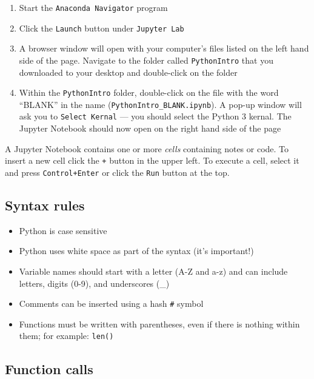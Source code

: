 \documentclass[
]{book}
\providecommand{\tightlist}{%
  \setlength{\itemsep}{0pt}\setlength{\parskip}{0pt}}
\begin{document}
\begin{enumerate}
\def\labelenumi{\arabic{enumi}.}
\tightlist
\item
  Start the \texttt{Anaconda\ Navigator} program
\item
  Click the \texttt{Launch} button under \texttt{Jupyter\ Lab}
\item
  A browser window will open with your computer's files listed on the left hand side of the page. Navigate to the folder called \texttt{PythonIntro} that you downloaded to your desktop and double-click on the folder
\item
  Within the \texttt{PythonIntro} folder, double-click on the file with the word ``BLANK'' in the name (\texttt{PythonIntro\_BLANK.ipynb}). A pop-up window will ask you to \texttt{Select\ Kernal} --- you should select the Python 3 kernal. The Jupyter Notebook should now open on the right hand side of the page
\end{enumerate}

A Jupyter Notebook contains one or more \emph{cells} containing notes or code. To insert a new cell click the \texttt{+} button in the upper left. To execute a cell, select it and press \texttt{Control+Enter} or click the \texttt{Run} button at the top.

\hypertarget{syntax-rules-1}{%
\subsection{Syntax rules}\label{syntax-rules-1}}

\begin{itemize}
\tightlist
\item
  Python is case sensitive
\item
  Python uses white space as part of the syntax (it's important!)
\item
  Variable names should start with a letter (A-Z and a-z)
  and can include letters, digits (0-9), and underscores (\_)
\item
  Comments can be inserted using a hash \texttt{\#} symbol
\item
  Functions must be written with parentheses, even
  if there is nothing within them; for example: \texttt{len()}
\end{itemize}

\hypertarget{function-calls-1}{%
\subsection{Function calls}\label{function-calls-1}}
\end{document}
